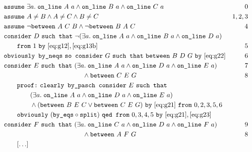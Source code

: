 \begin{boxedfigure}
\begin{align*}
& \code{assume}\ \exists a.\; \code{on\_line}\ A\ a\wedge\code{on\_line}\ B\ a\wedge\code{on\_line}\ C\ a & 0\\
& \code{assume}\ A\neq B \wedge A\neq C \wedge B \neq C & 1,2,3\\
& \code{assume}\ \neg\between{A}{C}{B} \wedge \neg\between{B}{A}{C} & 4\\
& \code{consider}\ D\ \code{such that}\ \Triangle{a}{A}{B}{D}\\
& \qquad\code{from}\ 1\ \code{by}\ \eqref{eq:g12},\eqref{eq:g13b}& 5\\
& \code{obviously by\_neqs}\ \code{so consider}\ G\ \code{such that}\ \between{B}{D}{G}\ \code{by}\ \eqref{eq:g22} & 6\\
& \code{consider}\ E\ \code{such that}\ (\exists a.\; \code{on\_line}\ A\ a\wedge \code{on\_line}\ D\ a\wedge \code{on\_line}\ E\ a) & 7\\
& \qquad\qquad\qquad\qquad\qquad\qquad \wedge\between{C}{E}{G}\ & 8\\
&\qquad \code{proof:}\ \code{clearly by\_pasch consider}\ E\ \code{such that}\\
&\qquad\qquad (\exists a.\; \code{on\_line}\ A\ a\wedge \code{on\_line}\ D\ a\wedge \code{on\_line}\ E\ a)\\
&\qquad\qquad \wedge (\between{B}{E}{C} \vee \between{C}{E}{G})\ \code{by}\ \eqref{eq:g21}\ \code{from}\ 0,2,3,5,6\\
&\qquad\code{obviously}\ (\code{by\_eqs}\circ\code{split})\ \code{qed from}\ 0,3,4,5\ \code{by}\ \eqref{eq:g21},\eqref{eq:g23}\\
& \code{consider}\ F\ \code{such that}\ (\exists a.\; \code{on\_line}\ C\ a\wedge \code{on\_line}\ D\ a\wedge \code{on\_line}\ F\ a) & 9\\
& \qquad\qquad\qquad\qquad\qquad\qquad \wedge\between{A}{F}{G}\ & 8\\
&\qquad[\ldots]\\

\end{align*}
\end{boxedfigure}
